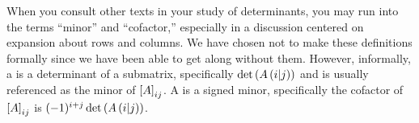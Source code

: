 \documentclass{ximera}
\begin{document}
When you consult other texts in your study of determinants, you may
run into the terms ``minor'' and ``cofactor,'' especially in a
discussion centered on expansion about rows and columns.  We have
chosen not to make these definitions formally since we have been able
to get along without them.  However, informally, a  is a
determinant of a submatrix, specifically
$\det\left(A\left(i|j\right)\right)$ and is usually referenced as the minor
of $\left\lbrack A\right\rbrack_{ij}$.  A  is a signed minor,
specifically the cofactor of $\left\lbrack A\right\rbrack_{ij}$ is
$(-1)^{i+j}\det\left(A\left(i|j\right)\right)$.
\end{document}
